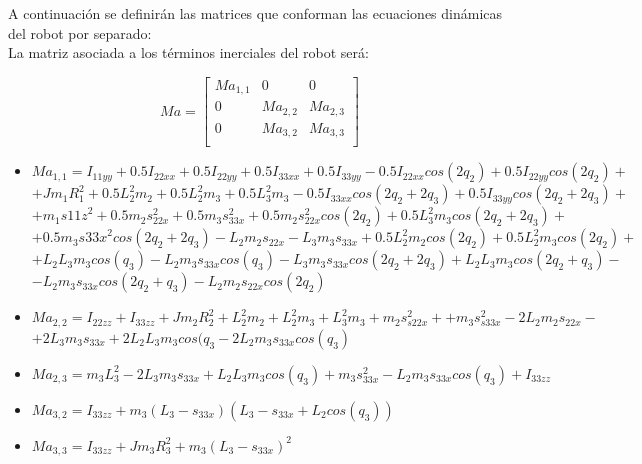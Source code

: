 A continuación se definirán las matrices que conforman las ecuaciones dinámicas del robot por separado: \\

La matriz asociada a los términos inerciales del robot será:

\[
Ma=
\begin{bmatrix}
Ma_{1,1} & 0 & 0\\
0 & Ma_{2,2} & Ma_{2,3}\\
0 & Ma_{3,2} & Ma_{3,3}\\
\end{bmatrix} \]



\begin{itemize}
	\item $Ma_{1,1}= I_{11yy}+0.5I_{22xx}+0.5I_{22yy}+0.5I_{33xx} +0.5I_{33yy} - 0.5I_{22xx}cos(2q_{2})+0.5I_{22yy}cos(2q_2) +$ \\ \vspace{0.1cm}
	$+ Jm_1R_{1}^{2} + 0.5L_{2}^{2}m_{2} +0.5L_{2}^{2}m_{3}+ 0.5L_{3}^{2}m_{3}- 0.5I_{33xx}cos(2q_{2} + 2q_{3}) +0.5I_{33yy}cos(2q_{2} + 2q_{3}) +$ \\ \vspace{0.1cm}
	$+ m_{1}s{11z}^{2} + 0.5m_{2}s_{22x}^{2}+ 0.5m_{3}s_{33x}^{2}+ 0.5m_{2}s_{22x}^{2}cos(2q_{2})+ 0.5L_{3}^{2}m_{3}cos(2q_{2} + 2q_{3})+ $ \\ \vspace{0.1cm}
	$+ 0.5m_{3}s{33x}^{2}cos(2q_{2}+2q_{3}) - L_{2}m_{2}s_{22x}- L_{3}m_{3}s_{33x} + 0.5L_{2}^{2}m_{2}cos(2q_{2})+ 0.5L_{2}^{2}m_{3}cos(2q_{2})+ $ \\ \vspace{0.1cm}
	$+ L_{2}L_{3}m_{3}cos(q_{3}) -L_{2}m_{3}s_{33x}cos(q_{3})- L_{3}m_{3}s_{33x}cos(2q_{2} + 2q_{3})+L_{2}L_{3}m_{3}cos(2q_{2} + q_{3}) - $ \\ \vspace{0.1cm}
	$- L_{2}m_{3}s_{33x}cos(2q_{2} + q_{3})-L_{2}m_{2}s_{22x}cos(2q_{2})$ \\ \vspace{0.2cm}
	\item $Ma_{2,2}=I_{22zz}+I_{33zz}+Jm_{2}R_{2}^{2}+L_{2}^{2}m_{2}+L_{2}^{2}m_{3}+L_{3}^{2}m_{3}+m_{2}s_{s22x}^{2}++m_{3}s_{s33x}^{2}- 2L_{2}m_{2}s_{22x} - $ \\ \vspace{0.1cm}
	$ + 2L_{3}m_{3}s_{33x}+ 2L_{2}L_{3}m_{3}cos(q_{3}-2L_{2}m_{3}s_{33x}cos(q_{3})$ \\ \vspace{0.2cm}
	\item $Ma_{2,3}=m_{3}L_{3}^{2}- 2L_{3}m_{3}s_{33x}+L_{2}L_{3}m_{3}cos(q_{3})+m_{3}s_{33x}^{2}-L_{2}m_{3}s_{33x}cos(q_{3})+I_{33zz}$ \\ \vspace{0.2cm}
	\item $Ma_{3,2}=I_{33zz}+m_{3}(L_{3}-s_{33x})(L_{3}-s_{33x}+L_{2}cos(q_{3}))$ \\ \vspace{0.2cm}
	\item $Ma_{3,3}=I_{33zz}+Jm_{3}R_{3}^{2}+m_{3}(L_{3}-s_{33x})^{2}$ \\ \vspace{0.2cm}
\end{itemize}
